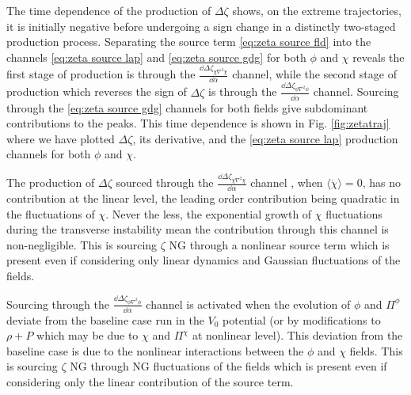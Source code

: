 The time dependence of the production of $\Delta\zeta$ shows, on the extreme trajectories, it is initially negative before undergoing a sign change in a distinctly two-staged production process. Separating the source term \eqref{eq:zeta source fld} into the channels \eqref{eq:zeta source lap} and \eqref{eq:zeta source gdg} for both $\phi$ and $\chi$ reveals the first stage of production is through the
$\frac{\dd\Delta\zeta_{\dot{\chi}\nabla^2\chi}}{\dd\alpha}$ channel,
while the second stage of production which reverses the sign of $\Delta\zeta$ is through the
$\frac{\dd\Delta\zeta_{\dot{\phi}\nabla^2\phi}}{\dd\alpha}$ channel.
Sourcing through the \eqref{eq:zeta source gdg} channels for both fields give subdominant contributions to the peaks. This time dependence is shown in Fig. \ref{fig:zetatraj} where we have plotted $\Delta\zeta$, its derivative, and the \eqref{eq:zeta source lap} production channels for both $\phi$ and $\chi$.

\Fzetatraj

The production of $\Delta\zeta$ sourced through the
$\frac{\dd\Delta\zeta_{\dot{\chi}\nabla^2\chi}}{\dd\alpha}$ channel
, when $\langle\dot{\chi}\rangle = 0$, has no contribution at the linear level, the leading order contribution being quadratic in the fluctuations of $\chi$. Never the less, the exponential growth of $\chi$ fluctuations during the transverse instability mean the contribution through this channel is non-negligible.
This is sourcing $\zeta$ NG through a nonlinear source term which is present even if considering only linear dynamics and Gaussian fluctuations of the fields.

Sourcing through the $\frac{\dd\Delta\zeta_{\dot{\phi}\nabla^2\phi}}{\dd\alpha}$ channel is activated when the evolution of $\phi$ and $\Pi^\phi$ deviate from the baseline case run in the $V_0$ potential (or by modifications to $\rho + P$ which may be due to $\chi$ and $\Pi^\chi$ at nonlinear level). This deviation from the baseline case is due to the nonlinear interactions between the $\phi$ and $\chi$ fields.
This is sourcing $\zeta$ NG through NG fluctuations of the fields which is present even if considering only the linear contribution of the source term.

\Fzetaslicemulti

